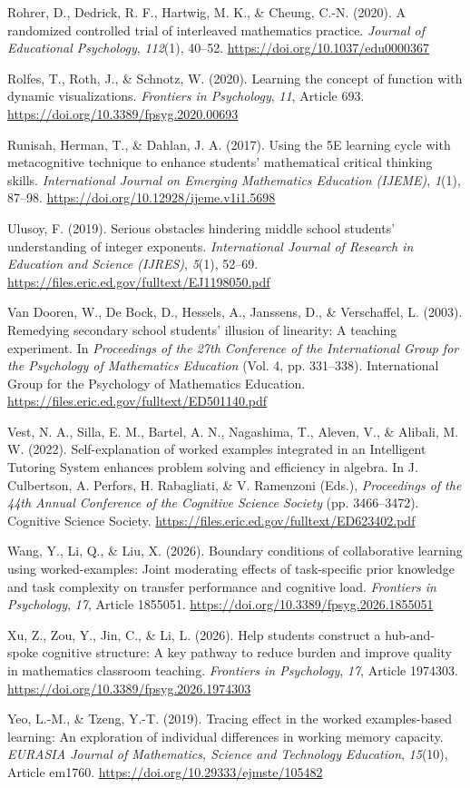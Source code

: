 \documentclass[a4paper,12pt]{article}
\begin{document}
{Rohrer, D., Dedrick, R. F., Hartwig, M. K., \& Cheung, C.-N. (2020). A randomized controlled trial of interleaved mathematics practice. \textit{Journal of Educational Psychology}, \textit{112}(1), 40--52. \url{https://doi.org/10.1037/edu0000367}

Rolfes, T., Roth, J., \& Schnotz, W. (2020). Learning the concept of function with dynamic visualizations. \textit{Frontiers in Psychology}, \textit{11}, Article 693. \url{https://doi.org/10.3389/fpsyg.2020.00693}

Runisah, Herman, T., \& Dahlan, J. A. (2017). Using the 5E learning cycle with metacognitive technique to enhance students' mathematical critical thinking skills. \textit{International Journal on Emerging Mathematics Education (IJEME)}, \textit{1}(1), 87--98. \url{https://doi.org/10.12928/ijeme.v1i1.5698}

Ulusoy, F. (2019). Serious obstacles hindering middle school students' understanding of integer exponents. \textit{International Journal of Research in Education and Science (IJRES)}, \textit{5}(1), 52--69. \url{https://files.eric.ed.gov/fulltext/EJ1198050.pdf}

Van Dooren, W., De Bock, D., Hessels, A., Janssens, D., \& Verschaffel, L. (2003). Remedying secondary school students' illusion of linearity: A teaching experiment. In \textit{Proceedings of the 27th Conference of the International Group for the Psychology of Mathematics Education} (Vol. 4, pp. 331--338). International Group for the Psychology of Mathematics Education. \url{https://files.eric.ed.gov/fulltext/ED501140.pdf}

Vest, N. A., Silla, E. M., Bartel, A. N., Nagashima, T., Aleven, V., \& Alibali, M. W. (2022). Self-explanation of worked examples integrated in an Intelligent Tutoring System enhances problem solving and efficiency in algebra. In J. Culbertson, A. Perfors, H. Rabagliati, \& V. Ramenzoni (Eds.), \textit{Proceedings of the 44th Annual Conference of the Cognitive Science Society} (pp. 3466--3472). Cognitive Science Society. \url{https://files.eric.ed.gov/fulltext/ED623402.pdf}

Wang, Y., Li, Q., \& Liu, X. (2026). Boundary conditions of collaborative learning using worked-examples: Joint moderating effects of task-specific prior knowledge and task complexity on transfer performance and cognitive load. \textit{Frontiers in Psychology}, \textit{17}, Article 1855051. \url{https://doi.org/10.3389/fpsyg.2026.1855051}

Xu, Z., Zou, Y., Jin, C., \& Li, L. (2026). Help students construct a hub-and-spoke cognitive structure: A key pathway to reduce burden and improve quality in mathematics classroom teaching. \textit{Frontiers in Psychology}, \textit{17}, Article 1974303. \url{https://doi.org/10.3389/fpsyg.2026.1974303}

Yeo, L.-M., \& Tzeng, Y.-T. (2019). Tracing effect in the worked examples-based learning: An exploration of individual differences in working memory capacity. \textit{EURASIA Journal of Mathematics, Science and Technology Education}, \textit{15}(10), Article em1760. \url{https://doi.org/10.29333/ejmste/105482}
\par}
\end{document}
